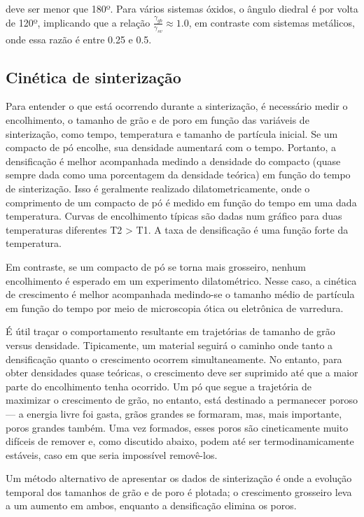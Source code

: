 deve ser menor que 180º. Para vários sistemas óxidos, o ângulo diedral é por volta de 120º, implicando que a relação $\frac{\gamma_{gb}}{\gamma_{sv}} \approx 1.0$, em contraste com sistemas metálicos, onde essa razão é entre 0.25 e 0.5.

\subsection*{Cinética de sinterização}

Para entender o que está ocorrendo durante a sinterização, é necessário medir o encolhimento, o tamanho de grão e de poro em função das variáveis de sinterização, como tempo, temperatura e tamanho de partícula inicial. Se um compacto de pó encolhe, sua densidade aumentará com o tempo. Portanto, a densificação é melhor acompanhada medindo a densidade do compacto (quase sempre dada como uma porcentagem da densidade teórica) em função do tempo de sinterização. Isso é geralmente realizado dilatometricamente, onde o comprimento de um compacto de pó é medido em função do tempo em uma dada temperatura. Curvas de encolhimento típicas são dadas num gráfico para duas temperaturas diferentes T2 > T1. A taxa de densificação é uma função forte da temperatura.

Em contraste, se um compacto de pó se torna mais grosseiro, nenhum encolhimento é esperado em um experimento dilatométrico. Nesse caso, a cinética de crescimento é melhor acompanhada medindo-se o tamanho médio de partícula em função do tempo por meio de microscopia ótica ou eletrônica de varredura.

É útil traçar o comportamento resultante em trajetórias de tamanho de grão versus densidade. Tipicamente, um material seguirá o caminho onde tanto a densificação quanto o crescimento ocorrem simultaneamente. No entanto, para obter densidades quase teóricas, o crescimento deve ser suprimido até que a maior parte do encolhimento tenha ocorrido. Um pó que segue a trajetória de maximizar o crescimento de grão, no entanto, está destinado a permanecer poroso — a energia livre foi gasta, grãos grandes se formaram, mas, mais importante, poros grandes também. Uma vez formados, esses poros são cineticamente muito difíceis de remover e, como discutido abaixo, podem até ser termodinamicamente estáveis, caso em que seria impossível removê-los.

Um método alternativo de apresentar os dados de sinterização é onde a evolução temporal dos tamanhos de grão e de poro é plotada; o crescimento grosseiro leva a um aumento em ambos, enquanto a densificação elimina os poros.

